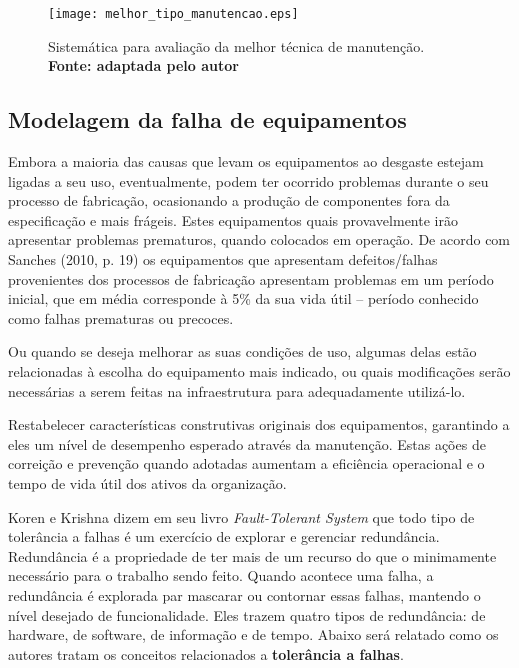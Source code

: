 \begin{landscape}
\graphicspath{{figuras/}}
\begin{figure}[H]
\centering
\texttt{[image: melhor\_tipo\_manutencao.eps]}
\caption{Sistemática para avaliação da melhor técnica de manutenção. \textbf{Fonte: \cite{neumann2013gestao} adaptada pelo autor}}
\label{melhor_tecnica_de_manutencao}
\end{figure}
\end{landscape}

\subsection{Modelagem da falha de equipamentos}

Embora a maioria das causas que levam os equipamentos ao desgaste estejam ligadas a seu uso, eventualmente, podem ter ocorrido problemas durante o seu processo de fabricação, ocasionando a produção de componentes fora da especificação e mais frágeis. Estes equipamentos quais provavelmente irão apresentar problemas prematuros, quando colocados em operação. De acordo com Sanches (2010, p. 19) os equipamentos que apresentam defeitos/falhas provenientes dos processos de fabricação apresentam problemas em um período inicial, que em média corresponde à 5\% da sua vida útil – período conhecido como falhas prematuras ou precoces.

Ou quando se deseja melhorar as suas condições de uso, algumas delas estão relacionadas à escolha do equipamento mais indicado, ou quais modificações serão necessárias a serem feitas na infraestrutura para adequadamente utilizá-lo.

Restabelecer características construtivas originais dos equipamentos, garantindo a eles um nível de desempenho esperado através da manutenção. 
Estas ações de correição e prevenção quando adotadas aumentam a eficiência operacional e o tempo de vida útil dos ativos da organização. 

Koren e Krishna \cite{koren2007} dizem em seu livro \emph{Fault-Tolerant System} que todo tipo de tolerância a falhas é um exercício de explorar e gerenciar redundância. Redundância é a propriedade de ter mais de um recurso do que o minimamente necessário para o trabalho sendo feito. Quando acontece uma falha, a redundância é explorada par mascarar ou contornar essas falhas, mantendo o nível desejado de funcionalidade. Eles trazem quatro tipos de redundância: de hardware, de software, de informação e de tempo. Abaixo será relatado como os autores tratam os conceitos relacionados a \textbf{tolerância a falhas}. 

